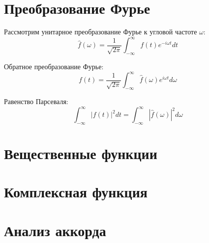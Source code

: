 \section{Преобразование Фурье}

Рассмотрим унитарное преобразование Фурье к угловой частоте $\omega$:
\begin{equation}
    \hat{f}(\omega) = \frac{1}{\sqrt{2\pi}} \int_{-\infty}^{\infty} f(t) e^{-i\omega t} dt
    \label{eq:image_from_function}
\end{equation}

Обратное преобразование Фурье:
\begin{equation}
    f(t) = \frac{1}{\sqrt{2\pi}} \int_{-\infty}^{\infty} \hat{f}(\omega) e^{i\omega t} d\omega
    \label{eq:function_from_image}
\end{equation}

Равенство Парсеваля:
\begin{equation}
    \int_{-\infty}^{\infty} |f(t)|^2 dt = \int_{-\infty}^{\infty} |\hat{f}(\omega)|^2 d\omega
    \label{eq:parseval_indentity}
\end{equation}


\section{Вещественные функции}

\FloatBarrier


\FloatBarrier

 
\FloatBarrier


\FloatBarrier


\FloatBarrier

\section{Комплексная функция}


\section{Анализ аккорда}

\FloatBarrier


